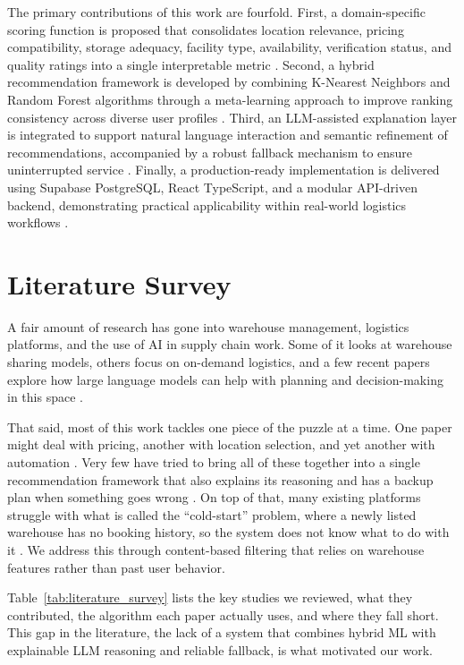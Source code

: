 \documentclass[pdflatex,sn-mathphys-num]{sn-jnl}
\theoremstyle{thmstyleone}
\theoremstyle{thmstyletwo}
\theoremstyle{thmstylethree}
\begin{document}
The primary contributions of this work are fourfold.
First, a domain-specific scoring function is proposed that
consolidates location relevance, pricing compatibility,
storage adequacy, facility type, availability, verification status,
and quality ratings into a single interpretable metric
\cite{b1, b5}.
Second, a hybrid recommendation framework is developed by
combining K-Nearest Neighbors and Random Forest algorithms
through a meta-learning approach to improve ranking consistency
across diverse user profiles \cite{b10}.
Third, an LLM-assisted explanation layer is integrated to
support natural language interaction and semantic refinement
of recommendations, accompanied by a robust fallback mechanism
to ensure uninterrupted service \cite{b7, b4}.
Finally, a production-ready implementation is delivered using
Supabase PostgreSQL, React TypeScript, and a modular API-driven
backend, demonstrating practical applicability within real-world
logistics workflows \cite{b6}.


\section{Literature Survey}\label{sec2}

A fair amount of research has gone into warehouse management,
logistics platforms, and the use of AI in supply chain work.
Some of it looks at warehouse sharing models, others focus
on on-demand logistics, and a few recent papers explore how
large language models can help with planning and decision-making
in this space \cite{b7, b8}.

That said, most of this work tackles one piece of the puzzle
at a time.
One paper might deal with pricing, another with location
selection, and yet another with automation \cite{b2}.
Very few have tried to bring all of these together into a single
recommendation framework that also explains its reasoning
and has a backup plan when something goes wrong \cite{b3, b4}.
On top of that, many existing platforms struggle with what is
called the ``cold-start'' problem, where a newly listed warehouse
has no booking history, so the system does not know what to do
with it \cite{b10}.
We address this through content-based filtering that relies
on warehouse features rather than past user behavior.

Table~\ref{tab:literature_survey} lists the key studies
we reviewed, what they contributed, the algorithm each paper
actually uses, and where they fall short.
This gap in the literature, the lack of a system that combines
hybrid ML with explainable LLM reasoning and reliable fallback,
is what motivated our work.
\end{document}
